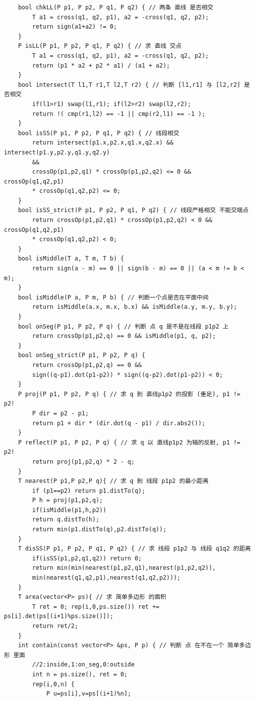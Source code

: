 \documentclass[a4paper,12pt]{article}
\begin{document}
\begin{lstlisting}
    bool chkLL(P p1, P p2, P q1, P q2) { // 两条 直线 是否相交
        T a1 = cross(q1, q2, p1), a2 = -cross(q1, q2, p2);
        return sign(a1+a2) != 0;
    }
    P isLL(P p1, P p2, P q1, P q2) { // 求 直线 交点
        T a1 = cross(q1, q2, p1), a2 = -cross(q1, q2, p2);
        return (p1 * a2 + p2 * a1) / (a1 + a2);
    }
    bool intersect(T l1,T r1,T l2,T r2) { // 判断 [l1,r1] 与 [l2,r2] 是否相交
        if(l1>r1) swap(l1,r1); if(l2>r2) swap(l2,r2);
        return !( cmp(r1,l2) == -1 || cmp(r2,l1) == -1 );
    }
    bool isSS(P p1, P p2, P q1, P q2) { // 线段相交
        return intersect(p1.x,p2.x,q1.x,q2.x) && intersect(p1.y,p2.y,q1.y,q2.y)
        &&
        crossOp(p1,p2,q1) * crossOp(p1,p2,q2) <= 0 && crossOp(q1,q2,p1)
        * crossOp(q1,q2,p2) <= 0;
    }
    bool isSS_strict(P p1, P p2, P q1, P q2) { // 线段严格相交 不能交端点
        return crossOp(p1,p2,q1) * crossOp(p1,p2,q2) < 0 && crossOp(q1,q2,p1)
        * crossOp(q1,q2,p2) < 0;
    }
    bool isMiddle(T a, T m, T b) {
        return sign(a - m) == 0 || sign(b - m) == 0 || (a < m != b < m);
    }
    bool isMiddle(P a, P m, P b) { // 判断一个点是否在平面中间
        return isMiddle(a.x, m.x, b.x) && isMiddle(a.y, m.y, b.y);
    }
    bool onSeg(P p1, P p2, P q) { // 判断 点 q 是不是在线段 p1p2 上
        return crossOp(p1,p2,q) == 0 && isMiddle(p1, q, p2);
    }
    bool onSeg_strict(P p1, P p2, P q) {
        return crossOp(p1,p2,q) == 0 && 
        sign((q-p1).dot(p1-p2)) * sign((q-p2).dot(p1-p2)) < 0;
    }
    P proj(P p1, P p2, P q) { // 求 q 到 直线p1p2 的投影 (垂足), p1 != p2!
        P dir = p2 - p1;
        return p1 + dir * (dir.dot(q - p1) / dir.abs2());
    }
    P reflect(P p1, P p2, P q) { // 求 q 以 直线p1p2 为轴的反射, p1 != p2!
        return proj(p1,p2,q) * 2 - q;
    }
    T nearest(P p1,P p2,P q){ // 求 q 到 线段 p1p2 的最小距离
        if (p1==p2) return p1.distTo(q);
        P h = proj(p1,p2,q);
        if(isMiddle(p1,h,p2))
        return q.distTo(h);
        return min(p1.distTo(q),p2.distTo(q));
    }
    T disSS(P p1, P p2, P q1, P q2) { // 求 线段 p1p2 与 线段 q1q2 的距离
        if(isSS(p1,p2,q1,q2)) return 0;
        return min(min(nearest(p1,p2,q1),nearest(p1,p2,q2)),
        min(nearest(q1,q2,p1),nearest(q1,q2,p2)));
    }
    T area(vector<P> ps){ // 求 简单多边形 的面积
        T ret = 0; rep(i,0,ps.size()) ret += ps[i].det(ps[(i+1)%ps.size()]);
        return ret/2;
    }
    int contain(const vector<P> &ps, P p) { // 判断 点 在不在一个 简单多边形 里面
        //2:inside,1:on_seg,0:outside
        int n = ps.size(), ret = 0;
        rep(i,0,n) {
            P u=ps[i],v=ps[(i+1)%n];

\end{lstlisting}
\end{document}
